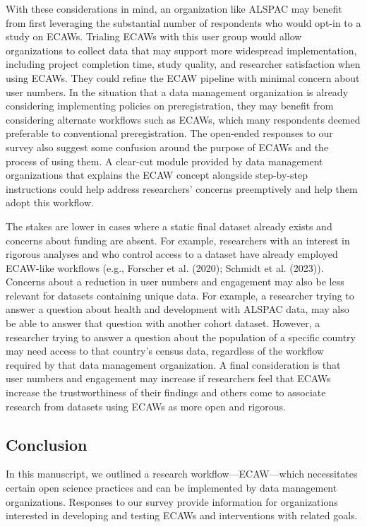 \documentclass[
  man,floatsintext]{apa6}
\begin{document}
With these considerations in mind, an organization like ALSPAC may benefit from first leveraging the substantial number of respondents who would opt-in to a study on ECAWs. Trialing ECAWs with this user group would allow organizations to collect data that may support more widespread implementation, including project completion time, study quality, and researcher satisfaction when using ECAWs. They could refine the ECAW pipeline with minimal concern about user numbers. In the situation that a data management organization is already considering implementing policies on preregistration, they may benefit from considering alternate workflows such as ECAWs, which many respondents deemed preferable to conventional preregistration. The open-ended responses to our survey also suggest some confusion around the purpose of ECAWs and the process of using them. A clear-cut module provided by data management organizations that explains the ECAW concept alongside step-by-step instructions could help address researchers' concerns preemptively and help them adopt this workflow.

The stakes are lower in cases where a static final dataset already exists and concerns about funding are absent. For example, researchers with an interest in rigorous analyses and who control access to a dataset have already employed ECAW-like workflows (e.g., Forscher et al. (2020); Schmidt et al. (2023)). Concerns about a reduction in user numbers and engagement may also be less relevant for datasets containing unique data. For example, a researcher trying to answer a question about health and development with ALSPAC data, may also be able to answer that question with another cohort dataset. However, a researcher trying to answer a question about the population of a specific country may need access to that country's census data, regardless of the workflow required by that data management organization. A final consideration is that user numbers and engagement may increase if researchers feel that ECAWs increase the trustworthiness of their findings and others come to associate research from datasets using ECAWs as more open and rigorous.

\hypertarget{conclusion}{%
\subsection{Conclusion}\label{conclusion}}

In this manuscript, we outlined a research workflow---ECAW---which necessitates certain open science practices and can be implemented by data management organizations. Responses to our survey provide information for organizations interested in developing and testing ECAWs and interventions with related goals.
\end{document}
